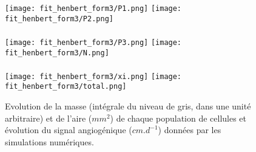 \documentclass[main.tex]{subfiles}
\begin{document}
\begin{figure}[p]
\texttt{[image: fit\_henbert\_form3/P1.png]} \qquad
\texttt{[image: fit\_henbert\_form3/P2.png]} \\ \\
\texttt{[image: fit\_henbert\_form3/P3.png]} \qquad
\texttt{[image: fit\_henbert\_form3/N.png]} \\ \\
\texttt{[image: fit\_henbert\_form3/xi.png]} \qquad
\texttt{[image: fit\_henbert\_form3/total.png]}
\caption{Evolution de la masse (intégrale du niveau de gris, dans une unité arbitraire) et de l'aire ($mm^2$) de chaque population de cellules et évolution du signal angiogénique ($cm.d^{-1}$) données par les simulations numériques.} \label{fig:simu_henbert_mass_area}
\end{figure}
\end{document}
